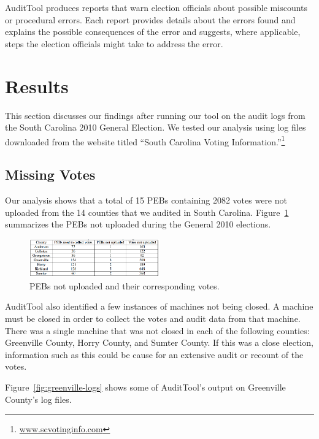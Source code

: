 \documentclass[letterpaper,twocolumn,10pt]{article}
\begin{document}
AuditTool produces reports that warn election officials about possible miscounts
or procedural errors. Each report provides details about the errors found and
explains the possible consequences of the error and suggests, where applicable,
steps the election officials might take to address the error.

\section{Results}
This section discusses our findings after running our tool on the audit logs
from the South Carolina 2010 General Election. We tested our analysis using log
files downloaded from the website titled “South Carolina Voting
Information.”\footnote{\url{www.scvotinginfo.com}} 

\subsection{Missing Votes}
Our analysis shows that a total of 15 PEBs containing 2082 votes were not
uploaded from the 14 counties that we audited in South
Carolina. Figure~\ref{fig:pebs-not-uploaded} summarizes the PEBs not uploaded
during the General 2010 elections.  

\begin{figure}[htbp]
\begin{center}
    \includegraphics[width=0.5\textwidth,height=0.1\textheight]{PEBsNotUploaded1.eps}
\end{center}
\caption{PEBs not uploaded and their corresponding votes.}
\label{fig:pebs-not-uploaded}
\end{figure}

AuditTool also identified a few instances of machines not being closed. A
machine must be closed in order to collect the votes and audit data from that
machine. There was a single machine that was not closed in each of the following
counties: Greenville County, Horry County, and Sumter County. If this was a
close election, information such as this could be cause for an extensive audit
or recount of the votes.  

Figure~\ref{fig:greenville-logs} shows some of AuditTool’s output on Greenville
County’s log files. 
\end{document}
